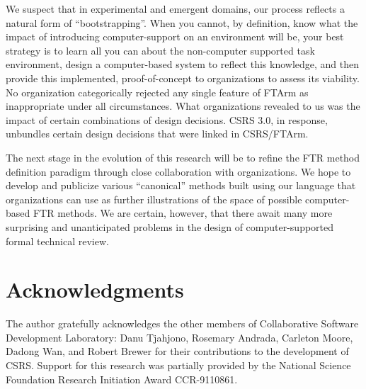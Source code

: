 We suspect that in experimental and emergent domains, our process reflects
a natural form of ``bootstrapping''.  When you cannot, by definition, know
what the impact of introducing computer-support on an environment will be,
your best strategy is to learn all you can about the non-computer supported
task environment, design a computer-based system to reflect this knowledge,
and then provide this implemented, proof-of-concept to organizations to
assess its viability.  No organization categorically rejected any single
feature of FTArm as inappropriate under all circumstances.  What
organizations revealed to us was the impact of certain combinations of
design decisions.  CSRS 3.0, in response, unbundles certain design
decisions that were linked in CSRS/FTArm.  

The next stage in the evolution of this research will be to refine the FTR
method definition paradigm through close collaboration with organizations.
We hope to develop and publicize various ``canonical'' methods built using
our language that organizations can use as further illustrations of the
space of possible computer-based FTR methods.  We are certain, however,
that there await many more surprising and unanticipated problems in the
design of computer-supported formal technical review.





\section*{Acknowledgments}

The author gratefully acknowledges the other members of Collaborative
Software Development Laboratory: Danu Tjahjono, Rosemary Andrada, Carleton
Moore, Dadong Wan, and Robert Brewer for their contributions to the
development of CSRS. Support for this research was partially provided by
the National Science Foundation Research Initiation Award CCR-9110861.

